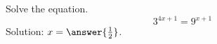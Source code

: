 \documentclass{ximera}
\author{Bobby Ramsey}
\begin{document}
\begin{exercise}
	Solve the equation.
	\[ 3^{4x+1} = 9^{x+1} \]
	Solution: $x = \answer{\frac{1}{2}}$.
\end{exercise}
\end{document}
